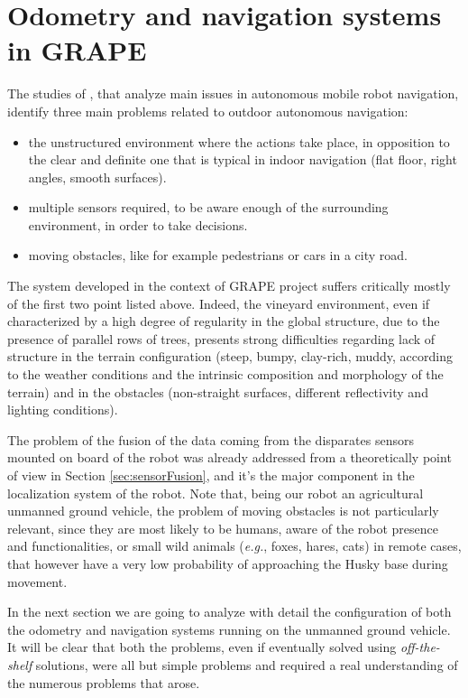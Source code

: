 
\chapter{Odometry and navigation systems in GRAPE} \label{chap:localization}

The studies of \cite{outdoorNavigation}, that analyze main issues in autonomous mobile robot navigation, identify three main problems related to outdoor autonomous navigation:
\begin{itemize}
	\item the unstructured environment where the actions take place, in opposition to the clear and definite one that is typical in indoor navigation (flat floor, right angles, smooth surfaces).
	\item multiple sensors required, to be aware enough of the surrounding environment, in order to take decisions.
	\item moving obstacles, like for example pedestrians or cars in a city road.
\end{itemize}
The system developed in the context of \ac{GRAPE} project suffers critically mostly of the first two point listed above. Indeed, the vineyard environment, even if characterized by a high degree of regularity in the global structure, due to the presence of parallel rows of trees, presents strong difficulties regarding lack of structure in the terrain configuration (steep, bumpy, clay-rich, muddy, according to the weather conditions and the intrinsic composition and morphology of the terrain) and in the obstacles (non-straight surfaces, different reflectivity and lighting conditions). 
	\par The problem of the fusion of the data coming from the disparates sensors mounted on board of the robot was already addressed from a theoretically point of view in Section \ref{sec:sensorFusion}, and it's the major component in the localization system of the robot. Note that, being our robot an agricultural unmanned ground vehicle, the problem of moving obstacles is not particularly relevant, since they are most likely to be humans, aware of the robot presence and functionalities, or small wild animals (\textit{e.g.}, foxes, hares, cats) in remote cases, that however have a very low probability of approaching the Husky base during movement.

\par In the next section we are going to analyze with detail the configuration of both the odometry and navigation systems running on the unmanned ground vehicle. It will be clear that both the problems, even if eventually solved using \textit{off-the-shelf} solutions, were all but simple problems and required a real understanding of the numerous problems that arose.

